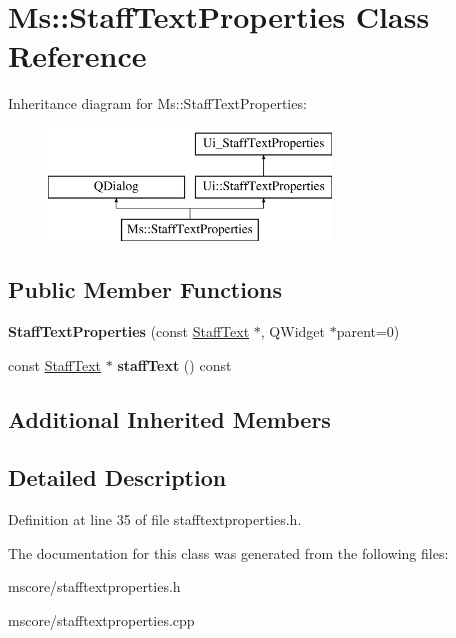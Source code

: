 \hypertarget{class_ms_1_1_staff_text_properties}{}\section{Ms\+:\+:Staff\+Text\+Properties Class Reference}
\label{class_ms_1_1_staff_text_properties}
Inheritance diagram for Ms\+:\+:Staff\+Text\+Properties\+:\begin{figure}[H]
\begin{center}
\leavevmode
\includegraphics[height=3.000000cm]{class_ms_1_1_staff_text_properties}
\end{center}
\end{figure}
\subsection*{Public Member Functions}
\begin{DoxyCompactItemize}
\item 
\mbox{\label{class_ms_1_1_staff_text_properties_aeb62620fcba48c820044643eb2a6b976}} 
{\bfseries Staff\+Text\+Properties} (const \hyperlink{class_ms_1_1_staff_text}{Staff\+Text} $\ast$, Q\+Widget $\ast$parent=0)
\item 
\mbox{\label{class_ms_1_1_staff_text_properties_acbec74122441a52fd9f1af55457e97f1}} 
const \hyperlink{class_ms_1_1_staff_text}{Staff\+Text} $\ast$ {\bfseries staff\+Text} () const
\end{DoxyCompactItemize}
\subsection*{Additional Inherited Members}


\subsection{Detailed Description}


Definition at line 35 of file stafftextproperties.\+h.



The documentation for this class was generated from the following files\+:\begin{DoxyCompactItemize}
\item 
mscore/stafftextproperties.\+h\item 
mscore/stafftextproperties.\+cpp\end{DoxyCompactItemize}
